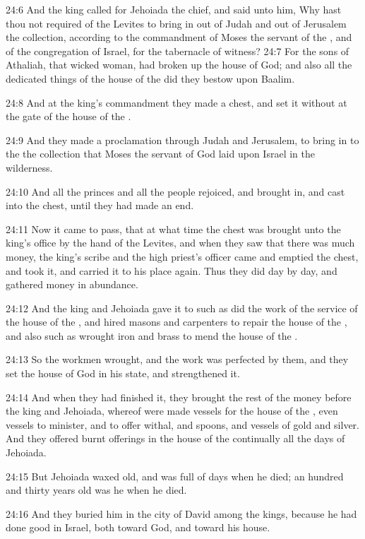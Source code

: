 24:6 And the king called for Jehoiada the chief, and said unto him,
Why hast thou not required of the Levites to bring in out of Judah and
out of Jerusalem the collection, according to the commandment of Moses
the servant of the \LORD, and of the congregation of Israel, for the
tabernacle of witness?  24:7 For the sons of Athaliah, that wicked
woman, had broken up the house of God; and also all the dedicated
things of the house of the \LORD did they bestow upon Baalim.

24:8 And at the king's commandment they made a chest, and set it
without at the gate of the house of the \LORD.

24:9 And they made a proclamation through Judah and Jerusalem, to
bring in to the \LORD the collection that Moses the servant of God laid
upon Israel in the wilderness.

24:10 And all the princes and all the people rejoiced, and brought in,
and cast into the chest, until they had made an end.

24:11 Now it came to pass, that at what time the chest was brought
unto the king's office by the hand of the Levites, and when they saw
that there was much money, the king's scribe and the high priest's
officer came and emptied the chest, and took it, and carried it to his
place again. Thus they did day by day, and gathered money in
abundance.

24:12 And the king and Jehoiada gave it to such as did the work of the
service of the house of the \LORD, and hired masons and carpenters to
repair the house of the \LORD, and also such as wrought iron and brass
to mend the house of the \LORD.

24:13 So the workmen wrought, and the work was perfected by them, and
they set the house of God in his state, and strengthened it.

24:14 And when they had finished it, they brought the rest of the
money before the king and Jehoiada, whereof were made vessels for the
house of the \LORD, even vessels to minister, and to offer withal, and
spoons, and vessels of gold and silver. And they offered burnt
offerings in the house of the \LORD continually all the days of
Jehoiada.

24:15 But Jehoiada waxed old, and was full of days when he died; an
hundred and thirty years old was he when he died.

24:16 And they buried him in the city of David among the kings,
because he had done good in Israel, both toward God, and toward his
house.

